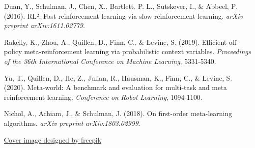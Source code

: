 \documentclass[12pt]{article}
\begin{document}
{{\begin{thebibliography}{9}
				Duan, Y., Schulman, J., Chen, X., Bartlett, P. L., Sutskever, I., \& Abbeel, P. (2016). RL²: Fast reinforcement learning via slow reinforcement learning. \textit{arXiv preprint arXiv:1611.02779}.
				
				Rakelly, K., Zhou, A., Quillen, D., Finn, C., \& Levine, S. (2019). Efficient off-policy meta-reinforcement learning via probabilistic context variables. \textit{Proceedings of the 36th International Conference on Machine Learning}, 5331-5340.
				
				Yu, T., Quillen, D., He, Z., Julian, R., Hausman, K., Finn, C., \& Levine, S. (2020). Meta-world: A benchmark and evaluation for multi-task and meta reinforcement learning. \textit{Conference on Robot Learning}, 1094-1100.
				
				Nichol, A., Achiam, J., \& Schulman, J. (2018). On first-order meta-learning algorithms. \textit{arXiv preprint arXiv:1803.02999}.
				
				\href{https://www.freepik.com/free-vector/cute-artificial-intelligence-robot-isometric-icon_16717130.htm}{Cover image designed by freepik}
				
			\end{thebibliography}
			
	}}
	
	
\end{document}
